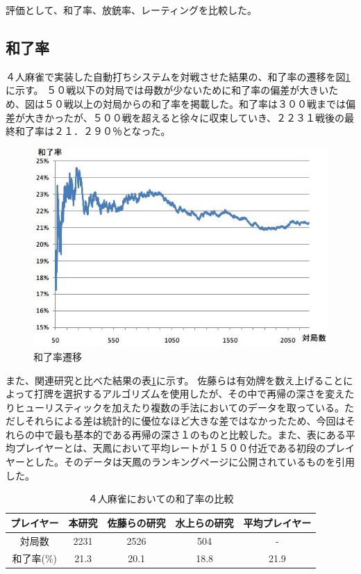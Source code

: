 評価として、和了率、放銃率、レーティングを比較した。


\subsection{和了率}
４人麻雀で実装した自動打ちシステムを対戦させた結果の、和了率の遷移を図\ref{houra2231}に示す。
５０戦以下の対局では母数が少ないために和了率の偏差が大きいため、図は５０戦以上の対局からの和了率を掲載した。和了率は３００戦までは偏差が大きかったが、５００戦を超えると徐々に収束していき、２２３１戦後の最終和了率は２１．２９０％となった。

\begin{figure}[h]
 \centering
 \includegraphics[keepaspectratio, scale=0.8,bb=0 0 546 369]
      {img/houra2231.jpg}
 \caption{和了率遷移}
 \label{houra2231}
\end{figure}

また、関連研究と比べた結果の表\ref{tb:houraritu}に示す。
佐藤らは有効牌を数え上げることによって打牌を選択するアルゴリズムを使用したが、その中で再帰の深さを変えたりヒューリスティックを加えたり複数の手法においてのデータを取っている。ただしそれらによる差は統計的に優位なほど大きな差ではなかったため、今回はそれらの中で最も基本的である再帰の深さ１のものと比較した。また、表にある平均プレイヤーとは、天鳳において平均レートが１５００付近である初段のプレイヤーとした。そのデータは天鳳のランキングページに公開されているものを引用した。

\begin{table}[h]
  \caption{４人麻雀においての和了率の比較}
  \label{tb:houraritu}
  \begin{center}
  \begin{tabular}{c|c|c|c|c}
    \hline
    プレイヤー   & 本研究 & 佐藤らの研究 & 水上らの研究 & 平均プレイヤー\\\hline\hline
    対局数   & 2231 & 2526 & 504 & -\\\hline
    和了率(\%) & 21.3 & 20.1 & 18.8 & 21.9\\\hline
  \end{tabular}\end{center}
\end{table}

